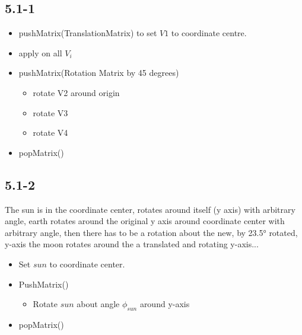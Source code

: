 \documentclass{article}
\begin{document}
\subsection*{5.1-1}
\begin{itemize}
	\item pushMatrix(TranslationMatrix) to set $V1$ to coordinate centre.
	\item apply on all $V_i$
	\item pushMatrix(Rotation Matrix by 45 degrees)
	\begin{itemize}
		\item rotate V2 around origin
		\item rotate V3
		\item rotate V4
	\end{itemize}
	\item popMatrix()
\end{itemize}


\subsection*{5.1-2} The sun is in the coordinate center, rotates around itself (y axis) with arbitrary angle, earth rotates around the original y axis around coordinate center with arbitrary angle, then there has to be a rotation about the new, by 23.5° rotated, y-axis the moon rotates around the a translated and rotating y-axis...
\begin{itemize}
\item Set $sun$ to coordinate center.
\item PushMatrix()
\begin{itemize}
\item Rotate $sun$ about angle $\phi_{sun}$ around y-axis
\end{itemize}
\item popMatrix()
\end{itemize}
\end{document}
